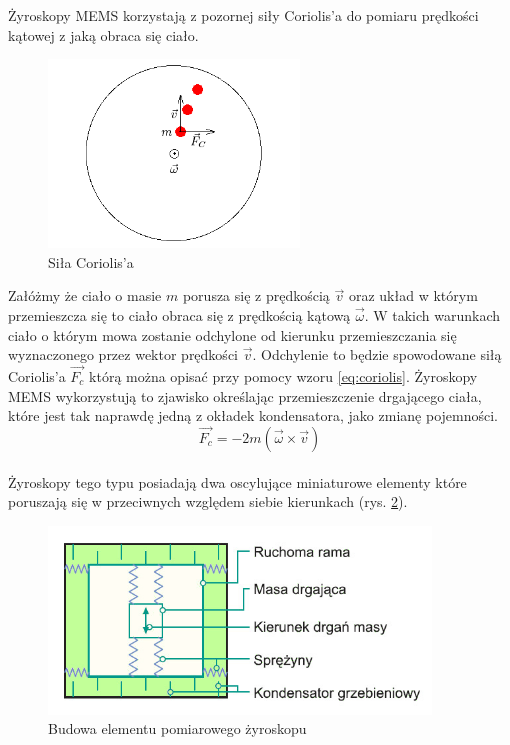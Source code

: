 Żyroskopy MEMS korzystają z pozornej siły Coriolis'a do pomiaru prędkości kątowej
z jaką obraca się ciało. \begin{figure}[!ht]
 \centering \includegraphics[height=50mm]{../images/ch04/coriolis.png}
 \caption{Siła Coriolis'a}
 \label{fig:Coriolis}
\end{figure}
Załóżmy że ciało o masie $m$ porusza się z prędkością $\vec{v}$ oraz układ w
którym przemieszcza się to ciało obraca się z prędkością kątową $\vec{\omega}$. W
takich warunkach ciało o którym mowa zostanie odchylone od kierunku
przemieszczania się wyznaczonego przez wektor prędkości $\vec{v}$. Odchylenie to
będzie spowodowane siłą Coriolis'a $\vec{F_{c}}$ którą można opisać przy pomocy
wzoru \ref{eq:coriolis}. Żyroskopy MEMS wykorzystują to zjawisko określając
przemieszczenie drgającego ciała, które jest tak naprawdę jedną z okładek
kondensatora, jako zmianę pojemności.
\begin{equation}
  \label{eq:coriolis}
  \vec{F_{c}} = -2m \left(\vec{\omega}\times\vec{v}\right)
\end{equation}
\\
Żyroskopy tego typu posiadają dwa oscylujące miniaturowe elementy które poruszają się w przeciwnych względem siebie kierunkach (rys. \ref{fig:ZyroOsc}). 
\begin{figure}[!ht]
 \centering
 \includegraphics[height=50mm]{../images/ch04/mems_osc.jpg}
 \caption{Budowa elementu pomiarowego żyroskopu\cite{website::elektronikab2b.pl}}
 \label{fig:ZyroOsc}
\end{figure}
